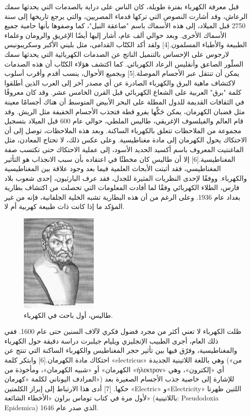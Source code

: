 \documentclass[a4paper]{book}
\begin{document}
قبل معرفة الكهرباء بفترة طويلة، كان الناس على دراية بالصدمات التي
يحدثها سمك الرعاش، وقد أشارت النصوص التي تركها قدماء المصريين، والتي
يرجع تاريخها إلى سنة 2750 قبل الميلاد، إلى هذه الأسماك باسم "صاعقة
النيل"، كما وصفوها بأنها حامية جميع الأسماك الأخرى. وبعد حوالي ألف
عام، أشار إليها أيضًا الإغريق والرومان وعلماء الطبيعة والأطباء
المسلمون.[4] ولقد أكد الكتّاب القدامى، مثل بليني الأكبر وسكريبونيس
لارجوس على الإحساس بالتنميل الناتج عن الصدمات الكهربائية التي يحدثها
سمك السلّور الصاعق وأنقليس الرعاد الكهربائي. كما اكتشف هؤلاء الكتّاب أن
هذه الصدمات يمكن أن تنتقل عبر الأجسام الموصلة.[5] وبجميع الأحوال، ينسب
أقدم وأقرب أسلوب لاكتشاف ماهية البرق والكهرباء الصادرة عن أي مصدر آخر
إلى العرب الذين أطلقوا كلمة "برق" العربية على الشعاع الكهربائي قبل
القرن الخامس عشر. وقد كان معروفًا في الثقافات القديمة للدول المطلة على
البحر الأبيض المتوسط أن هناك أجسامًا معينة مثل قضبان الكهرمان، يمكن
حَكِّها بفرو قطة فتجذب الأجسام الخفيفة مثل الريش. وقد قام العالم
والفيلسوف الإغريقي، طاليس الملطي، حوالي عام 600 قبل الميلاد بتسجيل
مجموعة من الملاحظات تتعلق بالكهرباء الساكنة. وبعد هذه الملاحظات، توصل
إلى أن الاحتكاك يحول الكهرمان إلى مادة مغناطيسية. وعلى عكس ذلك، لا
تحتاج المعادن، مثل الماغنتيت المعروف باسم أكسيد الحديد الأسود، إلى
عملية الاحتكاك حتى تكتسب صفة المغناطيسية.[6] إلا أن طاليس كان مخطئًا في
اعتقاده بأن سبب الانجذاب هو التأثير المغناطيسي، فقد أثبتت الأبحاث
العلمية فيما بعد وجود علاقة بين المغناطيسية والكهرباء. ووفقًا لإحدى
النظريات المثيرة للجدل، فقد عرف البارثيون، إحدى شعوب بلاد فارس، الطلاء
الكهربائي وفقًا لما أفادت المعلومات التي تحصلت من اكتشاف بطارية بغداد
عام 1936. وعلى الرغم من أن هذه البطارية تشبه الخلية الجلفانية، فإنه من
غير المؤكد ما إذا كانت ذات طبيعة كهربية أم لا.

\begin{figure}
\centering
  \includegraphics{Thales.png}
  \caption{طاليس، أول باحث في الكهرباء.}
\end{figure}

ظلت الكهرباء لا تعني أكثر من مجرد فضول فكري لآلاف السنين حتى عام
1600. ففي ذلك العام، أجرى الطبيب الإنجليزي ويليام جيلبرت دراسة دقيقة
حول الكهرباء والمغناطيسية، وفرّق فيها بين تأثير حجر المغناطيس والكهرباء
الساكنة التي تنتج عن احتكاك مادة الكهرمان.[6] وابتكر كلمة «electricus»
وهي باللغة اللاتينية الجديدة («من الكهرمان» أو «شبيه الكهرمان»،
ومأخوذة من «ήλεκτρον» أي «إلكترون»، وهي المرادف اليوناني لكلمة
«كهرمان») للإشارة إلى خاصية جذب الأجسام الصغيرة بعد حكها. [7] أدى هذا
الارتباط إلى إبراز الكلمتين «Electric» و«Electricity» اللتين ظهرتا
لأول مرة في كتاب توماس براون «الأخطاء الشائعة» (باللاتينية:
Pseudodoxia Epidemica) الذي صدر عام 1646.
\end{document}
